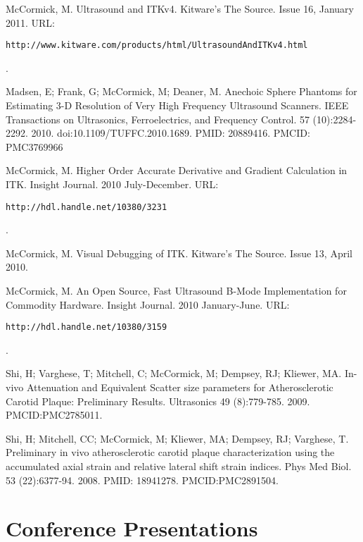 \documentclass[margin,line]{res}
\begin{document}
\begin{resume}
McCormick, M.  Ultrasound and ITKv4.  Kitware's The Source.  Issue 16, January
2011.
\vspace*{-.25in}
URL: \begin{verbatim}http://www.kitware.com/products/html/UltrasoundAndITKv4.html\end{verbatim}.
\vspace*{-.35in}

Madsen, E; Frank, G; McCormick, M; Deaner, M.  Anechoic Sphere Phantoms for
Estimating 3-D Resolution of Very High Frequency Ultrasound Scanners.
IEEE Transactions on Ultrasonics, Ferroelectrics, and Frequency Control. 57
(10):2284-2292. 2010.
doi:10.1109/TUFFC.2010.1689. PMID: 20889416. PMCID: PMC3769966

McCormick, M.  Higher Order Accurate Derivative and Gradient Calculation in ITK.
Insight Journal.  2010 July-December.
\vspace*{-.25in}
URL: \begin{verbatim}http://hdl.handle.net/10380/3231\end{verbatim}.
\vspace*{-.35in}

McCormick, M.  Visual Debugging of ITK.  Kitware's The Source.  Issue 13, April
2010.

McCormick, M.  An Open Source, Fast Ultrasound B-Mode Implementation for
Commodity Hardware.  Insight Journal.  2010 January-June.
\vspace*{-.25in}
URL: \begin{verbatim}http://hdl.handle.net/10380/3159\end{verbatim}.
\vspace*{-.35in}

Shi, H; Varghese, T; Mitchell, C; McCormick, M; Dempsey, RJ; Kliewer, MA.
In-vivo Attenuation and Equivalent Scatter size parameters for Atherosclerotic
Carotid Plaque: Preliminary Results.  Ultrasonics 49 (8):779-785.  2009.
PMCID:PMC2785011.

Shi, H; Mitchell, CC; McCormick, M; Kliewer, MA; Dempsey, RJ; Varghese, T.
Preliminary in vivo atherosclerotic carotid plaque characterization
using the accumulated axial strain and relative lateral shift strain
indices.  Phys Med Biol. 53 (22):6377-94. 2008. PMID:
18941278.  PMCID:PMC2891504.

\section{\sc Conference Presentations}


\end{resume}
\end{document}
